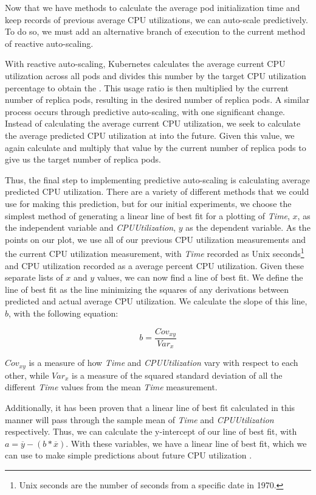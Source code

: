 Now that we have methods to calculate the average pod initialization time and
keep records of previous average CPU utilizations, we can auto-scale
predictively. To do so, we must add an alternative branch of execution to the
current method of reactive auto-scaling.

With reactive auto-scaling, Kubernetes calculates the average current CPU utilization
across all pods and divides this number by the target CPU utilization
percentage to obtain the . This usage ratio is then multiplied
by the current number of replica pods, resulting in the desired number of
replica pods. A similar process occurs through predictive auto-scaling, with one
significant change. Instead of calculating the average current CPU utilization,
we seek to calculate the average predicted CPU utilization at
 into the future. Given this value, we again
calculate  and multiply that value by the current number of
replica pods to give us the target number of replica pods.

Thus, the final step to implementing predictive auto-scaling is calculating
average predicted CPU utilization. There are a variety of different methods that
we could use for making this prediction, but for our initial experiments, we
choose the simplest method of generating a linear line of best fit for a
plotting of \textit{Time}, $x$, as the independent variable and
\textit{CPUUtilization}, $y$ as the dependent variable. As the points on our plot, we
use all of our previous CPU utilization measurements and the current CPU
utilization measurement, with \textit{Time}
recorded as Unix seconds\footnote{Unix seconds are the number of seconds from a
specific date in 1970.} and CPU utilization recorded as a average percent CPU
utilization. Given these separate lists of $x$ and $y$ values, we can now find a
line of best fit. We define the line of best fit as the line minimizing the
squares of any derivations between predicted and actual average CPU utilization.
We calculate the slope of this line, $b$, with the following equation:

\[ b = \frac{Cov_{xy}}{Var_{x}}\]

$Cov_{xy}$ is a measure of how \textit{Time} and \textit{CPUUtilization} vary
with respect to each other, while $Var_{{x}}$ is a measure of the squared standard
deviation of all the different \textit{Time} values from the mean \textit{Time}
measurement.

Additionally, it has been proven that a linear line of best fit calculated in
this manner will pass through the sample mean of \textit{Time} and
\textit{CPUUtilization} respectively. Thus, we can calculate the y-intercept of
our line of best fit,  with $a = \overline{y} - (b * \overline{x})$. With
these variables, we have a linear line of best fit, which we can use to make
simple predictions about future CPU utilization \cite{line-of-best-fit}.

